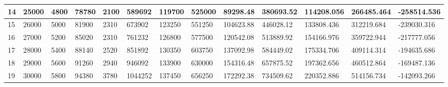 \begin{table}[]
{\begin{tabular}{|l|l|l|l|l|l|l|l|l|l|l|l|l|}
        14    & 25000     & 4800          & 78780                                                 & 2100                                                           & 589692                                                   & 119700                                                     & 525000                                                          & 89298.48  & 380693.52  & 114208.056    & 266485.464       & -258514.536     \\ \hline
        15    & 26000     & 5000          & 81900                                                 & 2310                                                           & 673902                                                   & 123250                                                     & 551250                                                          & 104623.88 & 446028.12  & 133808.436    & 312219.684       & -239030.316     \\ \hline
        16    & 27000     & 5200          & 85020                                                 & 2310                                                           & 761232                                                   & 126800                                                     & 577500                                                          & 120542.08 & 513889.92  & 154166.976    & 359722.944       & -217777.056     \\ \hline
        17    & 28000     & 5400          & 88140                                                 & 2520                                                           & 851892                                                   & 130350                                                     & 603750                                                          & 137092.98 & 584449.02  & 175334.706    & 409114.314       & -194635.686     \\ \hline
        18    & 29000     & 5600          & 91260                                                 & 2940                                                           & 946092                                                   & 133900                                                     & 630000                                                          & 154316.48 & 657875.52  & 197362.656    & 460512.864       & -169487.136     \\ \hline
        19    & 30000     & 5800          & 94380                                                 & 3780                                                           & 1044252                                                  & 137450                                                     & 656250                                                          & 172292.38 & 734509.62  & 220352.886    & 514156.734       & -142093.266     \\ \hline

\end{tabular}}
\end{table}
